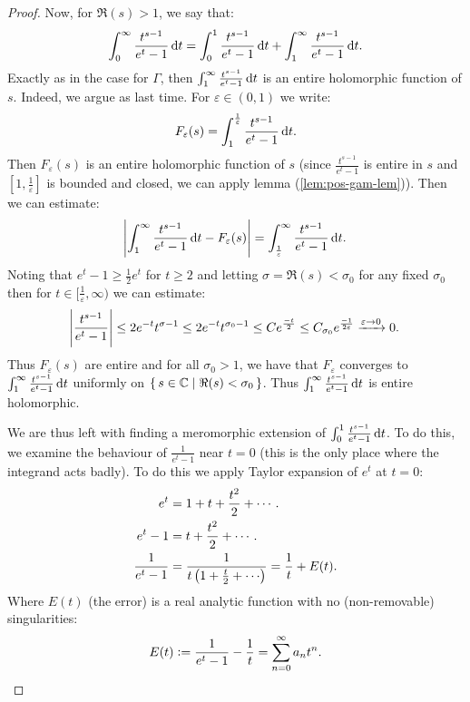 \begin{proof}
Now, for $\Re(s) > 1$, we say that:
\begin{align*}
    \int_0^\infty \frac{t^{s-1}}{e^t - 1}  \dif t =     \int_0^1 \frac{t^{s-1}}{e^t - 1}  \dif t +     \int_1^\infty \frac{t^{s-1}}{e^t - 1}  \dif t.
\end{align*}
Exactly as in the case for $\Gamma$, then $\int_1^\infty \frac{t^{s-1}}{e^t - 1}  \dif t$ is an entire holomorphic function of $s$. Indeed, we argue as last time. For $\varepsilon \in (0,1)$ we write:
\begin{align*}
    F_\varepsilon (s) = \int_1^{\frac{1}{\varepsilon}} \frac{t^{s-1}}{e^t-1} \dif t.
\end{align*}
Then $F_\varepsilon(s) $ is an entire holomorphic function of $s$ (since $\frac{t^{s-1}}{e^t - 1}$ is entire in $s$ and $[1, \frac{1}{\varepsilon}]$ is bounded and closed, we can apply lemma (\ref{lem:pos-gam-lem})). Then we can estimate:
\begin{align*}
    \abs{\int_1^\infty \frac{t^{s-1}}{e^t - 1}  \dif t - F_\varepsilon(s)} = \int_\frac{1}{\varepsilon}^\infty \frac{t^{s-1}}{e^t - 1}  \dif t.
\end{align*}
Noting that $e^t-1 \geq \frac{1}{2} e^t$ for $t \geq 2$ and letting $\sigma  = \Re(s) < \sigma_0$ for any fixed $\sigma_0$ then for $t \in [ \frac{1}{\varepsilon}, \infty ) $  we can estimate:
\begin{align*}
    \abs{\frac{t^{s-1}}{e^t-1}} \leq 2 e^{-t} t^{\sigma - 1} \leq 2 e^{-t} t^{\sigma_0 - 1} \leq C e^{\frac{-t}{2}} \leq C_{\sigma_0} e^\frac{-1}{2\varepsilon} \xrightarrow[]{\varepsilon \to 0} 0.
\end{align*}
Thus $F_\varepsilon(s)$ are entire and for all $\sigma_0 > 1$, we have that $F_\varepsilon$ converges to $\int_1^\infty \frac{t^{s-1}}{e^t - 1}  \dif t$ uniformly on $\set{s \in \mathbb{C}\mid \Re(s) < \sigma_0}$. Thus $\int_1^\infty \frac{t^{s-1}}{e^t - 1}  \dif t$ is entire holomorphic.

We are thus left with finding a meromorphic extension of $\int_0^1 \frac{t^{s-1}}{e^t - 1}  \dif t$. To do this, we examine the behaviour of $\frac{1}{e^t - 1}$ near $t=0$ (this is the only place where the integrand acts badly). To do this we apply Taylor expansion of $e^t$ at $t=0$:
\begin{align*}
    e^t &= 1+ t + \frac{t^2}{2}+ \cdots.\\
    e^t-1 &=  t + \frac{t^2}{2}+ \cdots.\\
    \frac{1}{e^t - 1} &= \frac{1}{t \br{1 + \frac{t}{2} + \cdots }} = \frac{1}{t} + E(t).
\end{align*}
Where $E(t)$ (the error) is a real analytic function with no (non-removable) singularities:
\begin{align*}
    E(t) \vcentcolon = \frac{1}{e^t-1} - \frac{1}{t} = \sum_{n=0}^\infty a_nt^n.
\end{align*}


\end{proof}
